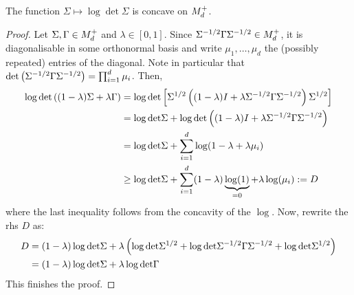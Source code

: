\begin{lemma}
The function $\Sigma \mapsto \log \det \Sigma$ is concave on $M^+_{d}$.
\end{lemma}
\begin{proof}
Let $\Sigma,\Gamma \in M^+_{d}$ and $\lambda \in [0,1]$.  Since $\Sigma^{-1/2}\Gamma\Sigma^{-1/2} \in M^+_{d}$, it is diagonalisable in some orthonormal basis and write $\mu_1,\ldots, \mu_d$ the (possibly repeated) entries of the diagonal. Note in particular that $\mathrm{det} \left( \Sigma^{-1/2}\Gamma\Sigma^{-1/2} \right)=\prod_{i=1}^d \mu_i$. Then,
\begin{align*}
\log \mathrm{det} \left( (1-\lambda)\Sigma+\lambda \Gamma \right)&=\log \mathrm{det} \left[ \Sigma^{1/2} \left( (1-\lambda)I+\lambda \Sigma^{-1/2}\Gamma\Sigma^{-1/2} \right) \Sigma^{1/2} \right]\\
&=\log \mathrm{det} \Sigma + \log \mathrm{det} \left( (1-\lambda)I+\lambda \Sigma^{-1/2}\Gamma\Sigma^{-1/2} \right) \nonumber \\
&=\log \mathrm{det} \Sigma + \sum_{i=1}^d \log(1-\lambda+\lambda \mu_i)\nonumber \\
& \geq \log \mathrm{det} \Sigma + \sum_{i=1}^d (1-\lambda) \underbrace{\log(1)}_{=0}+\lambda \log( \mu_i) \label{eq:diag}:= D
\end{align*}
where the last inequality follows from the concavity of the $\log$. Now, rewrite the rhs $D$ as:
\begin{align*}
D&=(1-\lambda) \log \mathrm{det} \Sigma + \lambda \left( \log \mathrm{det} \Sigma^{1/2}+ \log \mathrm{det} \Sigma^{-1/2}\Gamma\Sigma^{-1/2} + \log \mathrm{det} \Sigma^{1/2} \right) \\
&=(1-\lambda) \log \mathrm{det} \Sigma + \lambda \log \mathrm{det} \Gamma
\end{align*}
This finishes the proof.
\end{proof}






